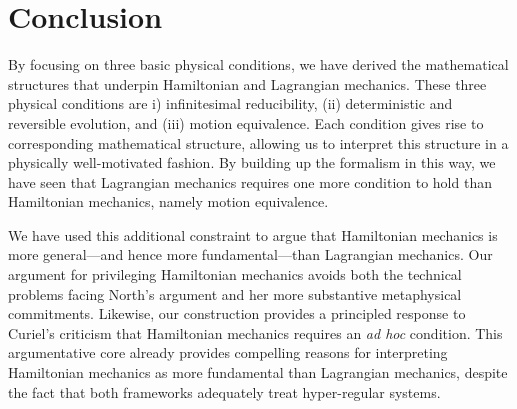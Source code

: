 \documentclass[letterpaper]{article}
\begin{document}

\section{Conclusion}
\label{conclusion}

By focusing on three basic physical conditions, we have derived the mathematical structures that underpin Hamiltonian and Lagrangian mechanics. These three physical conditions are i) infinitesimal reducibility, (ii) deterministic and reversible evolution, and (iii) motion equivalence. Each condition gives rise to corresponding mathematical structure, allowing us to interpret this structure in a physically well-motivated fashion. By building up the formalism in this way, we have seen that Lagrangian mechanics requires one more condition to hold than Hamiltonian mechanics, namely motion equivalence.

We have used this additional constraint to argue that Hamiltonian mechanics is more general---and hence more fundamental---than Lagrangian mechanics. Our argument for privileging Hamiltonian mechanics avoids both the technical problems facing North's \parencites*[]{North} argument and her more substantive metaphysical commitments. Likewise, our construction provides a principled response to Curiel's \parencites*[]{Curiel} criticism that Hamiltonian mechanics requires an \textit{ad hoc} condition. This argumentative core already provides compelling reasons for interpreting Hamiltonian mechanics as more fundamental than Lagrangian mechanics, despite the fact that both frameworks adequately treat hyper-regular systems.
\end{document}
